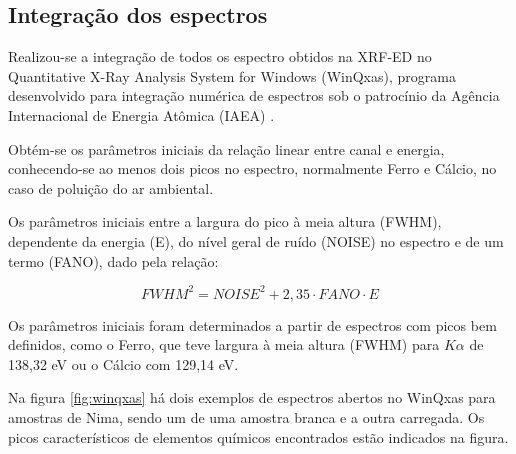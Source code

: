 \subsection{Integração dos espectros}

Realizou-se a integração de todos os espectro obtidos na XRF-ED no
Quantitative X-Ray Analysis System for Windows (WinQxas),
programa desenvolvido para integração numérica de espectros sob o patrocínio 
da Agência Internacional de Energia Atômica (IAEA) \citep{capote2000}.

Obtém-se os parâmetros iniciais da relação linear entre canal e energia,
conhecendo-se ao menos dois picos no espectro, normalmente Ferro e Cálcio, 
no caso de poluição do ar ambiental. 

Os parâmetros iniciais entre a largura do pico à meia altura (FWHM),
dependente da energia (E), do nível geral de ruído (NOISE) no espectro 
e de um termo (FANO), dado pela relação: 

\begin{equation}
  \label{eq:fwhm}
   {FWHM}^2 = {NOISE}^2 + 2,35 \cdot FANO  \cdot E
\end{equation}

Os parâmetros iniciais foram determinados a partir de espectros com picos 
bem definidos, como o Ferro, que teve largura à meia altura (FWHM) para 
$K\alpha$ de 138,32 eV ou o Cálcio com 129,14 eV.

Na figura \ref{fig:winqxas} há dois exemplos de espectros abertos no WinQxas
para amostras de Nima, sendo um de uma amostra branca e a outra carregada. Os picos 
característicos de elementos químicos encontrados estão indicados na figura.

